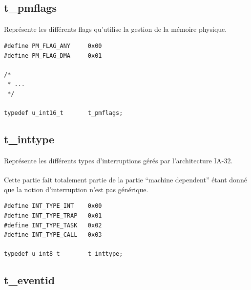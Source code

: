 \documentclass[10pt,a4wide]{article}
\begin{document}
\subsection{t\_pmflags}

\paragraph{}

Repr\'esente les diff\'erents flags qu'utilise la gestion de la m\'emoire
physique.

\begin{verbatim}
#define PM_FLAG_ANY     0x00
#define PM_FLAG_DMA     0x01

/*
 * ...
 */

typedef u_int16_t       t_pmflags;
\end{verbatim}

\subsection{t\_inttype}

\paragraph{}

Repr\'esente les diff\'erents types d'interruptions g\'er\'es par
l'architecture IA-32.

\paragraph{}

Cette partie fait totalement partie de la partie ``machine dependent''
\'etant donn\'e que la notion d'interruption n'est pas g\'en\'erique.

\begin{verbatim}
#define INT_TYPE_INT    0x00
#define INT_TYPE_TRAP   0x01
#define INT_TYPE_TASK   0x02
#define INT_TYPE_CALL   0x03

typedef u_int8_t        t_inttype;
\end{verbatim}

\subsection{t\_eventid}

\paragraph{}
\end{document}
